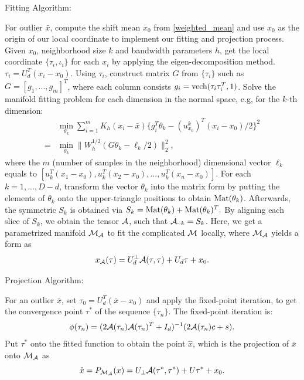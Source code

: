 \documentclass{article}
\theoremstyle{remark}
\begin{document}
\begin{algorithm}[H]
\caption{Fitting Algorithm:}
\label{alg:Fitting}
\begin{algorithmic}
\STATE [1.] For outlier $\bar{x}$, compute the shift mean $x_0$ from \eqref{weighted_mean} and use $x_0$ as the origin of our local coordinate to implement our fitting and projection process.
\STATE [2.] Given $x_0$, neighborhood size $k$ and bandwidth parameters $h$, get the local coordinate $\{\tau_i, \iota_i\}$ for each $x_i$ by applying the eigen-decomposition method.
$
{\tau}_i = U_d^T(x_i-x_0).%
$
Using $\tau_i$, construct matrix $G$ from $\{\tau_i\}$ such as $G = [g_1,...,g_m]^T$, where each column consists $g_i = {\rm vech}(\tau_i\tau_i^T, 1)$.%
\STATE [3.] Solve the manifold fitting problem for each dimension in the normal space, e.g, %
for the $k$-th dimension:
\[
\begin{aligned}
  &\min_{\theta_k} \sum_{i=1}^m K_h(x_i-\bar{x})\{ g_i^T \theta_k  -  {(u^k_{x_0})}^T (x_i -x_0)/2\}^2\\
= &\min_{\theta_k}\|W_h^{1/2}(G \theta_k-\ell_k/2) \|_2^2,
\end{aligned}
\]
where the $m$ (number of samples in the neighborhood) dimensional vector $\ell_k$ equals to $[u_k^T(x_1-x_0), u_k^T(x_2-x_0),...,u_k^T(x_n-x_0)]$.
\STATE [4.] For each $k=1,...,D-d$, transform the vector $\theta_k$ into the matrix form by putting the elements of $\theta_k$ onto the upper-triangle positions to obtain ${\rm Mat}(\theta_k)$.  Afterwards, the symmetric $S_k$ is obtained via %
$
S_k = {\rm Mat}(\theta_k) + {\rm Mat}(\theta_k) ^T.
$
By aligning each slice of $S_k$, we obtain the tensor $\cal A$, such that ${\cal A}_{\cdot \cdot k}=S_k$.
Here, we get a parametrized manifold ${\cal M_A}$ to fit the complicated $\cal M$ locally, where ${\cal M_A}$ yields a form as
\[
x_{\cal A}(\tau) = U_{d}^{\perp} {\cal A} (\tau, \tau) + U_d \tau +x_0.
\]
\end{algorithmic}
\end{algorithm}
\begin{algorithm}[H]
\caption{Projection Algorithm:}
\label{alg:projection}
\begin{algorithmic}
\STATE [1.] For an outlier $\bar{x}$, set $\tau_0 = U_d^T(\bar{x}-x_0)$ and apply the fixed-point iteration, to get the convergence point $\tau^*$ of the sequence $\{\tau_n\}$. The fixed-point iteration is: 
\[
 \phi(\tau_{n})=( 2{\cal A}(\tau_{n}){\cal A}(\tau_{n})^T+ I_d)^{-1} (2{\cal A}(\tau_{n})c+ s).
\]
\STATE [2.] Put $\tau^*$ onto the fitted function  to obtain the point $\hat{x}$, which is the projection of $\bar{x}$ onto ${\cal M}_{\cal A}$ as
\[
\hat{x} = P_{\cal M_A} (x) =  U_{\perp} {\cal A} (\tau^*,\tau^*) + U \tau^* +x_0.
\]
\end{algorithmic}
\end{algorithm}
\end{document}
